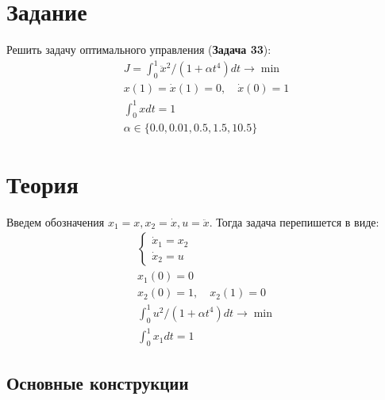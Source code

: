 \documentclass[a4paper,12pt]{article}
\newcommand{\UpdateMe}[1]{\textcolor{red}{#1}}
\newcommand{\University}{Московский государственный университет имени М.~В.~Ломоносова}
\newcommand{\Department}{Кафедра \UpdateMe{НАЗВАНИЕ-КАФЕДРЫ}}
\newcommand{\Student}{\UpdateMe{ИМЯ-СТУДЕНТА}}
\newcommand{\GroupNum}{\UpdateMe{НОМЕР}}
\newcommand{\Seminar}{Численные методы в задачах оптимального управления}
\begin{document}

\section*{Задание}
Решить задачу оптимального управления ({\bfseries Задача 33}):
\begin{gather*}
  J = \int_0^1 \ddot{x}^2/\left(1+\alpha t^4\right)dt \rightarrow \min\\
  x(1)=\dot{x}(1)=0,\quad \dot{x}(0) = 1\\
  \int_0^1xdt=1\\
  \alpha\in\{0.0, 0.01, 0.5, 1.5, 10.5\}
\end{gather*}

\section*{Теория}

Введем обозначения \(x_1=x, x_2=\dot{x}, u=\ddot{x}\). Тогда задача
перепишется в виде:
\begin{gather*}
  \begin{cases}\dot{x}_1=x_2\\ \dot{x}_2=u \end{cases}\\
  x_1(0)=0\\
  x_2(0)=1,\quad x_2(1)=0\\
  \int_0^1 u^2/\left(1+\alpha t^4\right)dt \rightarrow \min\\
  \int_0^1 x_1 dt=1
\end{gather*}

\subsection*{Основные конструкции}
\end{document}
